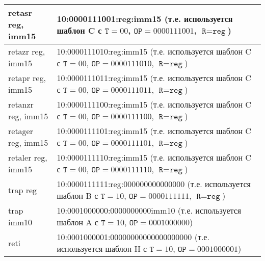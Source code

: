 \documentclass[10pt]{report}
\begin{document}
\begin{longtable}[c]{|l|p{12.5cm}|}
retasr reg, imm15               & 10:0000111001:reg:imm15  (т.е. используется шаблон C с $\texttt{T}=00$, $\texttt{OP}=0000111001$, $\texttt{R}=\texttt{reg}$)\\ \hline
retazr reg, imm15               & 10:0000111010:reg:imm15  (т.е. используется шаблон C с $\texttt{T}=00$, $\texttt{OP}=0000111010$, $\texttt{R}=\texttt{reg}$)\\ \hline
retapr reg, imm15               & 10:0000111011:reg:imm15  (т.е. используется шаблон C с $\texttt{T}=00$, $\texttt{OP}=0000111011$, $\texttt{R}=\texttt{reg}$)\\ \hline
retanzr reg, imm15              & 10:0000111100:reg:imm15  (т.е. используется шаблон C с $\texttt{T}=00$, $\texttt{OP}=0000111100$, $\texttt{R}=\texttt{reg}$)\\ \hline
retager reg, imm15              & 10:0000111101:reg:imm15  (т.е. используется шаблон C с $\texttt{T}=00$, $\texttt{OP}=0000111101$, $\texttt{R}=\texttt{reg}$)\\ \hline
retaler reg, imm15              & 10:0000111110:reg:imm15  (т.е. используется шаблон C с $\texttt{T}=00$, $\texttt{OP}=0000111110$, $\texttt{R}=\texttt{reg}$)\\ \hline
trap reg                        & 10:0000111111:reg:000000000000000 (т.е. используется шаблон B с $\texttt{T}=10$, $\texttt{OP}=0000111111$, $\texttt{R}=\texttt{reg}$) \\ \hline
trap imm10                      & 10:0001000000:0000000000imm10 (т.е. используется шаблон A с $\texttt{T}=10$, $\texttt{OP}=0001000000$) \\ \hline
reti                            & 10:0001000001:00000000000000000000 (т.е. используется шаблон H с $\texttt{T}=10$, $\texttt{OP}=0001000001$) \\ \hline
\end{longtable} 
\end{document}
